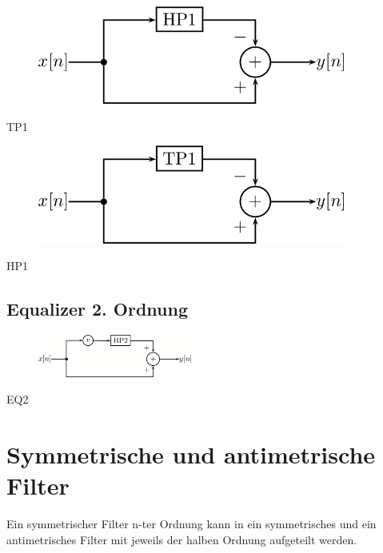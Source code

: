 \documentclass[a4paper, 12pt]{report}
\begin{document}
			\begin{minipage}[t]{0.5\textwidth}
				\begin{figure}[H]
					\centering
					\includegraphics[width=0.9\textwidth]{images/parallel_tp1.png}
				\end{figure}
				\begin{center}
					TP1
				\end{center}
			\end{minipage}
			\begin{minipage}[t]{0.5\textwidth}
				\begin{figure}[H]
					\centering
					\includegraphics[width=0.9\textwidth]{images/parallel_hp1.png}
				\end{figure}
				\begin{center}
					HP1
				\end{center}
			\end{minipage}
			
		\subsection*{Equalizer 2. Ordnung}
		\vspace{-0.5cm}
			\begin{figure}[H]
				\centering
				\includegraphics[width=0.45\textwidth]{images/parallel_eq2.png}
			\end{figure}
			\begin{center}
				EQ2
			\end{center}
		
\clearpage

	\section*{Symmetrische und antimetrische Filter}
		
		Ein symmetrischer Filter n-ter Ordnung kann in ein symmetrisches und ein antimetrisches Filter mit jeweils der halben Ordnung aufgeteilt werden.
\end{document}
